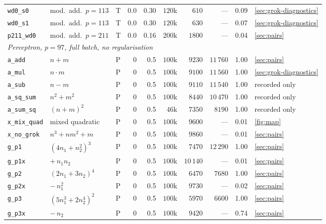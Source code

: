 \documentclass[twoside]{article}
\begin{document}
\begin{table}[H]
{\begin{tabular}{lllrrrrrrl}
\texttt{wd0\_s0}       & mod.\ add.\ $p{=}113$ & T & 0.0 & 0.30 & $120$k & $610$    & ---        & 0.09 & \cref{sec:grok-diagnostics} \\
\texttt{wd0\_s1}       & mod.\ add.\ $p{=}113$ & T & 0.0 & 0.30 & $120$k & $630$    & ---        & 0.07 & \cref{sec:grok-diagnostics} \\
\texttt{p211\_wd0}     & mod.\ add.\ $p{=}211$ & T & 0.0 & 0.16 & $200$k & $1800$ & ---        & 0.04 & \cref{sec:pairs} \\
\midrule
\multicolumn{10}{l}{\emph{Perceptron, $p = 97$, full batch, no regularisation}} \\
\texttt{a\_add}     & $n+m$                        & P & 0 & 0.5 & $100$k & $9230$  & $11\,760$ & 1.00 & \cref{sec:pairs} \\
\texttt{a\_mul}     & $n \cdot m$                  & P & 0 & 0.5 & $100$k & $9100$  & $11\,560$ & 1.00 & \cref{sec:grok-diagnostics} \\
\texttt{a\_sub}     & $n-m$                        & P & 0 & 0.5 & $100$k & $9110$  & $11\,540$ & 1.00 & recorded only \\
\texttt{a\_sq\_sum}  & $n^2+m^2$                    & P & 0 & 0.5 & $100$k & $8440$  & $10\,470$ & 1.00 & recorded only \\
\texttt{a\_sum\_sq}  & $(n+m)^2$                    & P & 0 & 0.5 & $46$k  & $7350$  & $8190$  & 1.00 & recorded only \\
\texttt{x\_mix\_quad} & mixed quadratic              & P & 0 & 0.5 & $100$k & $9600$  & ---       & 0.01 & \cref{fig:map} \\
\texttt{x\_no\_grok} & $n^3+nm^2+m$                 & P & 0 & 0.5 & $100$k & $9860$  & ---       & 0.01 & \cref{sec:pairs} \\
\texttt{g\_p1}      & $(4n_1+n_2^2)^3$             & P & 0 & 0.5 & $100$k & $7470$  & $12\,290$ & 1.00 & \cref{sec:pairs} \\
\texttt{g\_p1x}     & \quad $+\, n_1 n_2$          & P & 0 & 0.5 & $100$k & $10\,140$ & ---       & 0.01 & \cref{sec:pairs} \\
\texttt{g\_p2}      & $(2n_1+3n_2)^4$              & P & 0 & 0.5 & $100$k & $6470$  & $7680$  & 1.00 & \cref{sec:pairs} \\
\texttt{g\_p2x}     & \quad $-\, n_1^2$            & P & 0 & 0.5 & $100$k & $9730$  & ---       & 0.02 & \cref{sec:pairs} \\
\texttt{g\_p3}      & $(5n_1^3+2n_2^4)^2$          & P & 0 & 0.5 & $100$k & $5970$  & $6600$  & 1.00 & \cref{sec:pairs} \\
\texttt{g\_p3x}     & \quad $-\, n_2$              & P & 0 & 0.5 & $100$k & $9420$  & ---       & 0.74 & \cref{sec:pairs} \\
\bottomrule
\end{tabular}%
}
\end{table}
\end{document}
